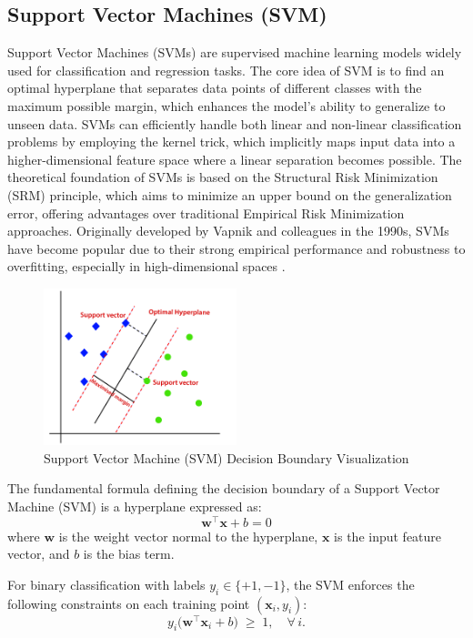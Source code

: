 \subsection{Support Vector Machines (SVM)}
\label{sec:svm}
Support Vector Machines (SVMs) are supervised machine learning models widely used for classification and regression tasks. The core idea of SVM is to find an optimal hyperplane that separates data points of different classes with the maximum possible margin, which enhances the model’s ability to generalize to unseen data. SVMs can efficiently handle both linear and non-linear classification problems by employing the kernel trick, which implicitly maps input data into a higher-dimensional feature space where a linear separation becomes possible. The theoretical foundation of SVMs is based on the Structural Risk Minimization (SRM) principle, which aims to minimize an upper bound on the generalization error, offering advantages over traditional Empirical Risk Minimization approaches. Originally developed by Vapnik and colleagues in the 1990s, SVMs have become popular due to their strong empirical performance and robustness to overfitting, especially in high-dimensional spaces \cite{Gunn1998SupportVM}.
\begin{figure}[H]
  \centering
  \includegraphics[width=0.5\textwidth]{Images/Chapter1/svm.png}
  \caption{Support Vector Machine (SVM) Decision Boundary Visualization}
  \label{fig:svm}
\end{figure}
The fundamental formula defining the decision boundary of a Support Vector Machine (SVM) is a hyperplane expressed as:
\begin{equation}
  \mathbf{w}^\top \mathbf{x} + b = 0
\end{equation}
where $\mathbf{w}$ is the weight vector normal to the hyperplane, $\mathbf{x}$ is the input feature vector, and $b$ is the bias term.

For binary classification with labels $y_i \in \{+1, -1\}$, the SVM enforces the following constraints on each training point $(\mathbf{x}_i, y_i)$:
\begin{equation}
  y_i \bigl(\mathbf{w}^\top \mathbf{x}_i + b\bigr) \;\ge\; 1,
  \quad \forall\,i.
\end{equation}

